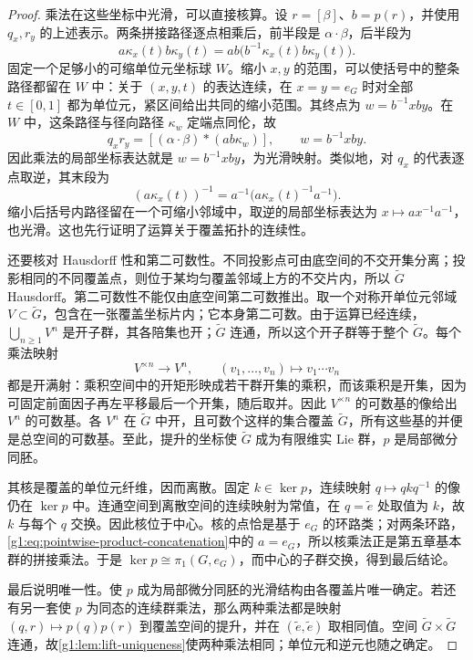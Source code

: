 \begin{proof}
	乘法在这些坐标中光滑，可以直接核算。设 \(r=[\beta]\)、\(b=p(r)\)，并使用 \(q_x,r_y\) 的上述表示。两条拼接路径逐点相乘后，前半段是 \(\alpha\cdot\beta\)，后半段为
	\[
		a\kappa_x(t)b\kappa_y(t)
		=ab\bigl(b^{-1}\kappa_x(t)b\kappa_y(t)\bigr).
	\]
	固定一个足够小的可缩单位元坐标球 \(W\)。缩小 \(x,y\) 的范围，可以使括号中的整条路径都留在 \(W\) 中：关于 \((x,y,t)\) 的表达连续，在 \(x=y=e_G\) 时对全部 \(t\in[0,1]\) 都为单位元，紧区间给出共同的缩小范围。其终点为 \(w=b^{-1}xby\)。在 \(W\) 中，这条路径与径向路径 \(\kappa_w\) 定端点同伦，故
	\[
		q_xr_y=[(\alpha\cdot\beta)*(ab\kappa_w)],\qquad w=b^{-1}xby.
	\]
	因此乘法的局部坐标表达就是 \(w=b^{-1}xby\)，为光滑映射。类似地，对 \(q_x\) 的代表逐点取逆，其末段为
	\[
		(a\kappa_x(t))^{-1}
		=a^{-1}\bigl(a\kappa_x(t)^{-1}a^{-1}\bigr).
	\]
	缩小后括号内路径留在一个可缩小邻域中，取逆的局部坐标表达为 \(x\mapsto ax^{-1}a^{-1}\)，也光滑。这也先行证明了运算关于覆盖拓扑的连续性。

	还要核对 Hausdorff 性和第二可数性。不同投影点可由底空间的不交开集分离；投影相同的不同覆盖点，则位于某均匀覆盖邻域上方的不交片内，所以 \(\widetilde G\) Hausdorff。第二可数性不能仅由底空间第二可数推出。取一个对称开单位元邻域 \(V\subset\widetilde G\)，包含在一张覆盖坐标片内；它本身第二可数。由于运算已经连续，\(\bigcup_{n\geq1}V^n\) 是开子群，其各陪集也开；\(\widetilde G\) 连通，所以这个开子群等于整个 \(\widetilde G\)。每个乘法映射
	\[
		V^{\times n}\longrightarrow V^n,\qquad
		(v_1,\ldots,v_n)\longmapsto v_1\cdots v_n
	\]
	都是开满射：乘积空间中的开矩形映成若干群开集的乘积，而该乘积是开集，因为可固定前面因子再左平移最后一个开集，随后取并。因此 \(V^{\times n}\) 的可数基的像给出 \(V^n\) 的可数基。各 \(V^n\) 在 \(\widetilde G\) 中开，且可数个这样的集合覆盖 \(\widetilde G\)，所有这些基的并便是总空间的可数基。至此，提升的坐标使 \(\widetilde G\) 成为有限维实 Lie 群，\(p\) 是局部微分同胚。

	其核是覆盖的单位元纤维，因而离散。固定 \(k\in\ker p\)，连续映射 \(q\mapsto qkq^{-1}\) 的像仍在 \(\ker p\) 中。连通空间到离散空间的连续映射为常值，在 \(q=\widetilde e\) 处取值为 \(k\)，故 \(k\) 与每个 \(q\) 交换。因此核位于中心。核的点恰是基于 \(e_G\) 的环路类；对两条环路，\eqref{g1:eq:pointwise-product-concatenation}中的 \(a=e_G\)，所以核乘法正是第五章基本群的拼接乘法。于是 \(\ker p\cong\pi_1(G,e_G)\)，而中心的子群交换，得到最后结论。

	最后说明唯一性。使 \(p\) 成为局部微分同胚的光滑结构由各覆盖片唯一确定。若还有另一套使 \(p\) 为同态的连续群乘法，那么两种乘法都是映射 \((q,r)\mapsto p(q)p(r)\) 到覆盖空间的提升，并在 \((\widetilde e,\widetilde e)\) 取相同值。空间 \(\widetilde G\times\widetilde G\) 连通，故\cref{g1:lem:lift-uniqueness}使两种乘法相同；单位元和逆元也随之确定。
\end{proof}

